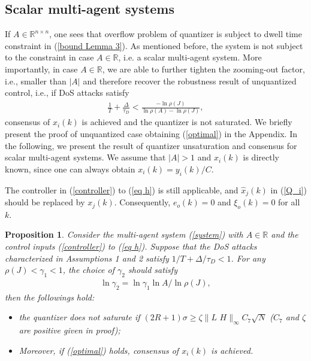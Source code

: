 \documentclass[letterpaper,journal,final,twocolumn]{IEEEtran}
\newtheorem{itproposition}{Proposition}
\newenvironment{proposition}{\begin{itproposition}\rm}{\end{itproposition}}
\begin{document}
\subsection{Scalar multi-agent systems}
If $A\in \mathbb R ^{n \times n}$, one sees that overflow problem of quantizer is subject to dwell time constraint in (\ref{bound Lemma 3}). As mentioned before, the system is not subject to the constraint in case $A \in \mathbb R$, i.e. a scalar multi-agent system. More importantly, in case $A \in  \mathbb R$, we are able to further tighten the zooming-out factor, i.e., smaller than $|A|$ and therefore recover the robustness result of unquantized control, i.e., 
if DoS attacks satisfy
\begin{align}\label{optimal} 
\frac{1}{T} + \frac{\Delta}{\tau_D} < \frac{-\ln \rho(J)}{\ln \rho(A)- \ln \rho(J)} ,
\end{align}
consensus of $x_i(k)$ is achieved and the quantizer is not saturated. We briefly present the proof of unquantized case obtaining (\ref{optimal}) in the Appendix. In the following, we present the result of quantizer unsaturation and consensus for scalar multi-agent systems. 
We assume that $|A|>1$ and $x_i(k)$ is directly known, since one can always obtain $x_i(k)=y_i(k)/C$.  







The controller in (\ref{controller}) to (\ref{eq h}) is still applicable, and $\hat x_j(k)$ in (\ref{Q_i}) should be replaced by $x_j(k)$. Consequently, $e_o(k)=0$ and $\xi_o(k)=0$ for all $k$. 






\begin{proposition}\label{Theorem 2}
	Consider the multi-agent system (\ref{system}) with $A\in \mathbb R$ and the control inputs (\ref{controller}) to (\ref{eq h}). Suppose that the DoS attacks characterized in Assumptions 1 and 2 satisfy $1/T + \Delta/\tau_D < 1$.  
	For any $\rho(J)<\gamma_1<1$, the choice of $\gamma_2$ should satisfy 
	\begin{align}\label{gamma 2 DoS}
	\ln \gamma_2 = \ln \gamma_1 \ln A /\ln \rho(J),
	\end{align}
	then the followings hold:
	\begin{itemize}
\item[(1)] 	the quantizer does not saturate if $(2R+1)\sigma \ge \zeta \|L \,\,H\|_\infty C_7 \sqrt{N}$ ($C_7$ and $\zeta$ are positive given in proof); 
\item[(2)] 	Moreover, if (\ref{optimal}) holds, consensus of $x_i(k)$ is achieved. 
	\end{itemize}
\end{proposition}
\end{document}

